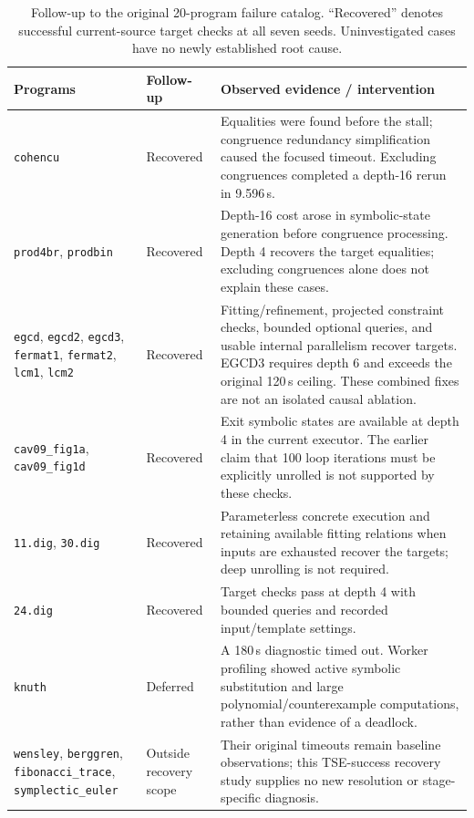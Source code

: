\documentclass[runningheads]{llncs}
\newcommand{\code}[1]{\texttt{\small #1}}
\begin{document}
\begin{table}[t]
\centering
\caption{Follow-up to the original 20-program failure catalog. ``Recovered'' denotes successful current-source target checks at all seven seeds. Uninvestigated cases have no newly established root cause.}
\label{tab:failures}
\scriptsize
\setlength{\tabcolsep}{2pt}
\begin{tabular}{p{2.5cm}p{1.5cm}p{7.2cm}}
\toprule
Programs & Follow-up & Observed evidence / intervention \\
\midrule
\code{cohencu} & Recovered & Equalities were found before the stall; congruence redundancy simplification caused the focused timeout. Excluding congruences completed a depth-16 rerun in 9.596\,s. \\
\code{prod4br}, \code{prodbin} & Recovered & Depth-16 cost arose in symbolic-state generation before congruence processing. Depth 4 recovers the target equalities; excluding congruences alone does not explain these cases. \\
\code{egcd}, \code{egcd2}, \code{egcd3}, \code{fermat1}, \code{fermat2}, \code{lcm1}, \code{lcm2} & Recovered & Fitting/refinement, projected constraint checks, bounded optional queries, and usable internal parallelism recover targets. EGCD3 requires depth 6 and exceeds the original 120\,s ceiling. These combined fixes are not an isolated causal ablation. \\
\code{cav09\_fig1a}, \code{cav09\_fig1d} & Recovered & Exit symbolic states are available at depth 4 in the current executor. The earlier claim that 100 loop iterations must be explicitly unrolled is not supported by these checks. \\
\code{11.dig}, \code{30.dig} & Recovered & Parameterless concrete execution and retaining available fitting relations when inputs are exhausted recover the targets; deep unrolling is not required. \\
\code{24.dig} & Recovered & Target checks pass at depth 4 with bounded queries and recorded input/template settings. \\
\code{knuth} & Deferred & A 180\,s diagnostic timed out. Worker profiling showed active symbolic substitution and large polynomial/counterexample computations, rather than evidence of a deadlock. \\
\code{wensley}, \code{berggren}, \code{fibonacci\_trace}, \code{symplectic\_euler} & Outside recovery scope & Their original timeouts remain baseline observations; this TSE-success recovery study supplies no new resolution or stage-specific diagnosis. \\
\bottomrule
\end{tabular}
\end{table}
\end{document}
